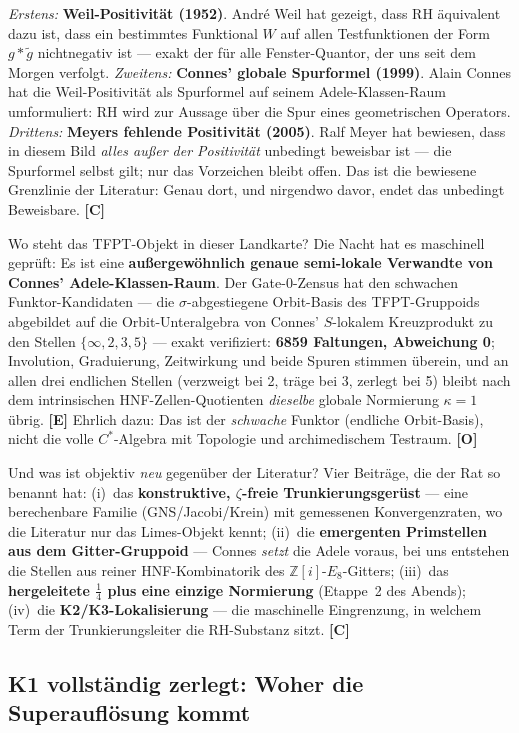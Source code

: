 \documentclass[11pt,a4paper]{article}
\newcommand{\E}{\textcolor{gut}{\textbf{[E]}}}
\newcommand{\C}{\textcolor{kern}{\textbf{[C]}}}
\newcommand{\OO}{\textcolor{offen}{\textbf{[O]}}}
\begin{document}
\emph{Erstens:} \textbf{Weil-Positivität (1952)}. André Weil hat
gezeigt, dass RH äquivalent dazu ist, dass ein bestimmtes
Funktional $W$ auf allen Testfunktionen der Form $g * \tilde g$
nichtnegativ ist --- exakt der \glqq{}für alle Fenster\grqq{}-Quantor,
der uns seit dem Morgen verfolgt. \emph{Zweitens:}
\textbf{Connes' globale Spurformel (1999)}. Alain Connes hat die
Weil-Positivität als Spurformel auf seinem Adele-Klassen-Raum
umformuliert: RH wird zur Aussage über die Spur eines
geometrischen Operators. \emph{Drittens:} \textbf{Meyers fehlende
Positivität (2005)}. Ralf Meyer hat bewiesen, dass in diesem Bild
\emph{alles außer der Positivität} unbedingt beweisbar ist --- die
Spurformel selbst gilt; nur das Vorzeichen bleibt offen. Das ist
die bewiesene Grenzlinie der Literatur: Genau dort, und nirgendwo
davor, endet das unbedingt Beweisbare. \C{}

Wo steht das TFPT-Objekt in dieser Landkarte? Die Nacht hat es
maschinell geprüft: Es ist eine \textbf{außergewöhnlich genaue
semi-lokale Verwandte von Connes' Adele-Klassen-Raum}. Der
Gate-0-Zensus hat den schwachen Funktor-Kandidaten --- die
$\sigma$-abgestiegene Orbit-Basis des TFPT-Gruppoids abgebildet
auf die Orbit-Unteralgebra von Connes' $S$-lokalem Kreuzprodukt zu
den Stellen $\{\infty, 2, 3, 5\}$ --- exakt verifiziert:
\textbf{6859 Faltungen, Abweichung 0}; Involution, Graduierung,
Zeitwirkung und beide Spuren stimmen überein, und an allen drei
endlichen Stellen (verzweigt bei 2, träge bei 3, zerlegt bei 5)
bleibt nach dem intrinsischen HNF-Zellen-Quotienten
\emph{dieselbe} globale Normierung $\kappa = 1$ übrig. \E{}
Ehrlich dazu: Das ist der \emph{schwache} Funktor (endliche
Orbit-Basis), nicht die volle $C^*$-Algebra mit Topologie und
archimedischem Testraum. \OO{}

Und was ist objektiv \emph{neu} gegenüber der Literatur? Vier
Beiträge, die der Rat so benannt hat: (i)~das \textbf{konstruktive,
$\zeta$-freie Trunkierungsgerüst} --- eine berechenbare Familie
(GNS/Jacobi/Krein) mit gemessenen Konvergenzraten, wo die
Literatur nur das Limes-Objekt kennt; (ii)~die \textbf{emergenten
Primstellen aus dem Gitter-Gruppoid} --- Connes \emph{setzt} die
Adele voraus, bei uns entstehen die Stellen aus reiner
HNF-Kombinatorik des $\mathbb{Z}[i]$-$E_8$-Gitters; (iii)~das
\textbf{hergeleitete $\tfrac14$ plus eine einzige Normierung}
(Etappe~2 des Abends); (iv)~die \textbf{K2/K3-Lokalisierung} ---
die maschinelle Eingrenzung, in welchem Term der Trunkierungsleiter
die RH-Substanz sitzt. \C{}

\subsection{K1 vollständig zerlegt: Woher die Superauflösung kommt}
\end{document}
